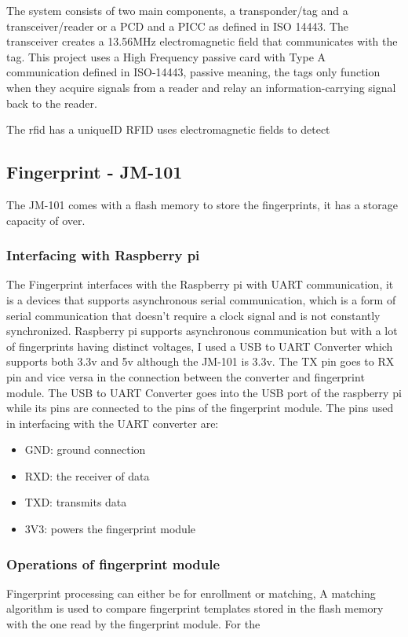
The system consists of two main components, a transponder/tag and a transceiver/reader or a PCD and a PICC as defined in ISO 14443. The transceiver creates a 13.56MHz electromagnetic field that communicates with the tag. 
This project uses a High Frequency passive card with Type A communication defined in ISO-14443, passive meaning, the tags only function when they acquire signals from a reader and relay an information-carrying signal back to the reader. 




The rfid has a uniqueID
RFID uses electromagnetic fields to detect 




\subsection{Fingerprint - JM-101}
The JM-101 comes with a flash memory to store the fingerprints, it has a storage capacity of over. 
\subsubsection{Interfacing with Raspberry pi}
The Fingerprint interfaces with the Raspberry pi with UART communication, it is a devices that supports asynchronous serial communication, which is a form of serial communication that doesn't require a clock signal and is not constantly synchronized. Raspberry pi supports asynchronous communication but with a lot of fingerprints having distinct voltages, I used a USB to UART Converter which supports both 3.3v and 5v although the JM-101 is 3.3v. The TX pin goes to RX pin and vice versa in the connection between the converter and fingerprint module. The USB to UART Converter goes into the USB port of the raspberry pi while its pins are connected to the pins of the fingerprint module.
The pins used in interfacing with the UART converter are:
\begin{itemize}
  \item GND: ground connection
  \item RXD: the receiver of data
  \item TXD: transmits data
  \item 3V3: powers the fingerprint module
\end{itemize}

\subsubsection{Operations of fingerprint module}
Fingerprint processing can either be for enrollment or matching,  
A matching algorithm is used to compare fingerprint templates stored in the flash memory with the one read by the fingerprint module. For the 

